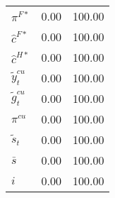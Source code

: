 \begin{center}
\begin{longtable}{lcc}
${\pi^{F*}}         $	 & 	              0.00	 & 	            100.00 \\ 
${\hat c^{F*}}      $	 & 	              0.00	 & 	            100.00 \\ 
${\hat c^{H*}}      $	 & 	              0.00	 & 	            100.00 \\ 
${\tilde y_t^{cu}}  $	 & 	              0.00	 & 	            100.00 \\ 
${\tilde g_t^{cu}}  $	 & 	              0.00	 & 	            100.00 \\ 
${\pi^{cu}}         $	 & 	              0.00	 & 	            100.00 \\ 
${\tilde s_t}       $	 & 	              0.00	 & 	            100.00 \\ 
${\bar s}           $	 & 	              0.00	 & 	            100.00 \\ 
${i}                $	 & 	              0.00	 & 	            100.00 \\ 
\end{longtable}
 \end{center}
